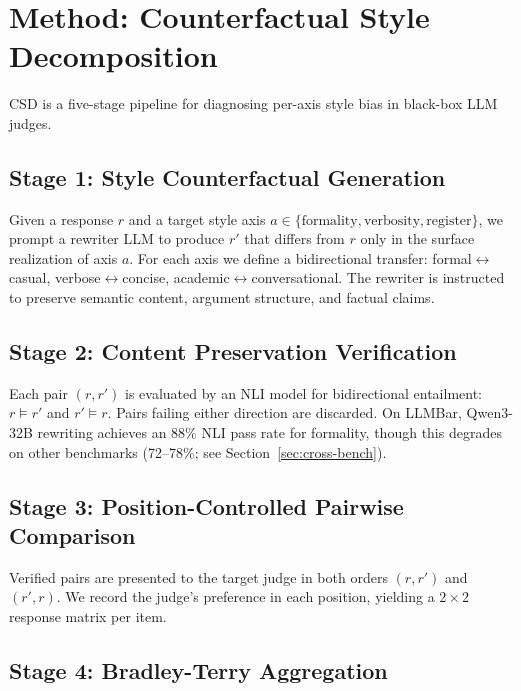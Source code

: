 \documentclass[11pt,a4paper]{article}
\begin{document}
\section{Method: Counterfactual Style Decomposition}

CSD is a five-stage pipeline for diagnosing per-axis style bias in black-box LLM judges.

\subsection{Stage 1: Style Counterfactual Generation}

Given a response $r$ and a target style axis $a \in \{\text{formality}, \text{verbosity}, \text{register}\}$, we prompt a rewriter LLM to produce $r'$ that differs from $r$ only in the surface realization of axis $a$. For each axis we define a bidirectional transfer: formal$\leftrightarrow$casual, verbose$\leftrightarrow$concise, academic$\leftrightarrow$conversational. The rewriter is instructed to preserve semantic content, argument structure, and factual claims.

\subsection{Stage 2: Content Preservation Verification}

Each pair $(r, r')$ is evaluated by an NLI model for bidirectional entailment: $r \models r'$ and $r' \models r$. Pairs failing either direction are discarded. On LLMBar, Qwen3-32B rewriting achieves an 88\% NLI pass rate for formality, though this degrades on other benchmarks (72--78\%; see Section~\ref{sec:cross-bench}).

\subsection{Stage 3: Position-Controlled Pairwise Comparison}

Verified pairs are presented to the target judge in both orders $(r, r')$ and $(r', r)$. We record the judge's preference in each position, yielding a $2 \times 2$ response matrix per item.

\subsection{Stage 4: Bradley-Terry Aggregation}
\end{document}
